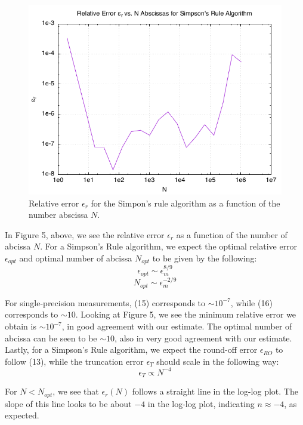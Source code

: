 \documentclass[12pt,letterpaper]{article}
\begin{document}
\begin{figure}[H]
	\centering
	\includegraphics[scale=0.6]{simpsons_rule.png}
	\caption{Relative error $\epsilon_r$ for the Simpon's rule algorithm as a function of the number abscissa $N$.}
\end{figure}

In Figure 5, above, we see the relative error $\epsilon_r$ as a function of the number of abcissa $N$. For a Simpson's Rule algorithm, we expect the optimal relative error $\epsilon_{opt}$ and optimal number of abcissa $N_{opt}$ to be given by the following:
\begin{equation}
	\epsilon_{opt} \sim \epsilon_{m}^{8/9}
\end{equation}
\begin{equation}
	N_{opt} \sim \epsilon_{m}^{-2/9}
\end{equation}

For single-precision measurements, (15) corresponds to $\sim 10^{-7}$, while (16) corresponds to $\sim 10$. Looking at Figure 5, we see the minimum relative error we obtain is $\sim 10^{-7}$, in good agreement with our estimate. The optimal number of abcissa can be seen to be $\sim 10$, also in very good agreement with our estimate. Lastly, for a Simpson's Rule algorithm, we expect the round-off error $\epsilon_{RO}$ to follow (13), while the truncation error $\epsilon_{T}$ should scale in the following way:
\begin{equation}
	\epsilon_{T} \propto N^{-4}
\end{equation}

For $N<N_{opt}$, we see that $\epsilon_{r}(N)$ follows a straight line in the log-log plot. The slope of this line looks to be about $-4$ in the log-log plot, indicating $n\approx -4$, as expected.\\
\end{document}
